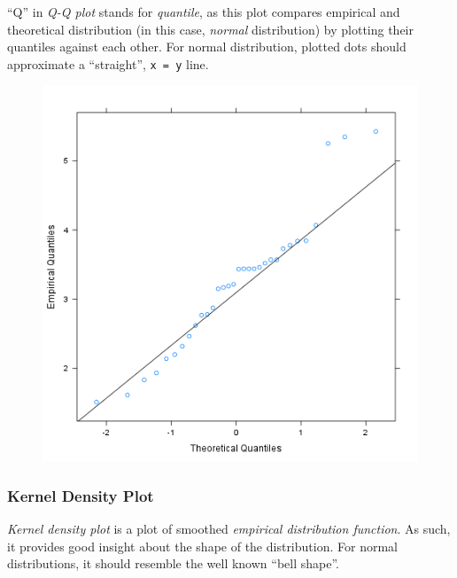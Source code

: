 \documentclass{article}
\makeatletter
\def\maxwidth{\ifdim\Gin@nat@width>\linewidth\linewidth
\else\Gin@nat@width\fi}
\let\Oldincludegraphics\includegraphics
\renewcommand{\includegraphics}[1]{\Oldincludegraphics[width=\maxwidth]{#1}}
\makeatother
\begin{document}
``Q'' in \emph{Q-Q plot} stands for \emph{quantile}, as this plot
compares empirical and theoretical distribution (in this case,
\emph{normal} distribution) by plotting their quantiles against each
other. For normal distribution, plotted dots should approximate a
``straight'', \texttt{x = y} line.

\begin{figure}[htbp]
\centering
\includegraphics{ff471a5bcb80aaf91b4c053ab038d69a.png}
\caption{}
\end{figure}

\subsubsection{Kernel Density Plot}

\emph{Kernel density plot} is a plot of smoothed \emph{empirical
distribution function}. As such, it provides good insight about the
shape of the distribution. For normal distributions, it should resemble
the well known ``bell shape''.
\end{document}
